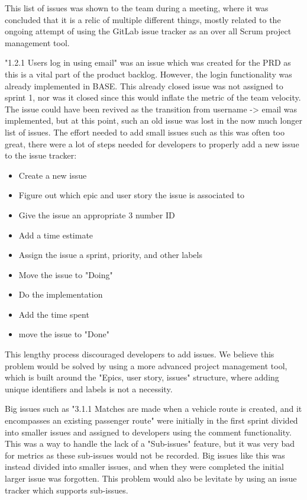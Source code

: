\documentclass{article}
\begin{document}
This list of issues was shown to the team during a meeting, where it was concluded that it is a relic of multiple different things, mostly related to the ongoing attempt of using the GitLab issue tracker as an over all Scrum project management tool.

"1.2.1 Users log in using email" was an issue which was created for the PRD as this is a vital part of the product backlog. However, the login functionality was already implemented in BASE. This already closed issue was not assigned to sprint 1, nor was it closed since this would inflate the metric of the team velocity. The issue could have been revived as the transition from username -> email was implemented, but at this point, such an old issue was lost in the now much longer list of issues. The effort needed to add small issues such as this was often too great, there were a lot of steps needed for developers to properly add a new issue to the issue tracker:

\begin{itemize}
    \item Create a new issue
    \item Figure out which epic and user story the issue is associated to
    \item Give the issue an appropriate 3 number ID
    \item Add a time estimate
    \item Assign the issue a sprint, priority, and other labels
    \item Move the issue to "Doing"
    \item Do the implementation
    \item Add the time spent
    \item move the issue to "Done"
\end{itemize}

This lengthy process discouraged developers to add issues. We believe this problem would be solved by using a more advanced project management tool, which is built around the "Epics, user story, issues" structure, where adding unique identifiers and labels is not a necessity.

Big issues such as "3.1.1 Matches are made when a vehicle route is created, and it encompasses an existing passenger route" were initially in the first sprint divided into smaller issues and assigned to developers using the comment functionality. This was a way to handle the lack of a "Sub-issues" feature, but it was very bad for metrics as these sub-issues would not be recorded. Big issues like this was instead divided into smaller issues, and when they were completed the initial larger issue was forgotten. This problem would also be levitate by using an issue tracker which supports sub-issues.
\end{document}
